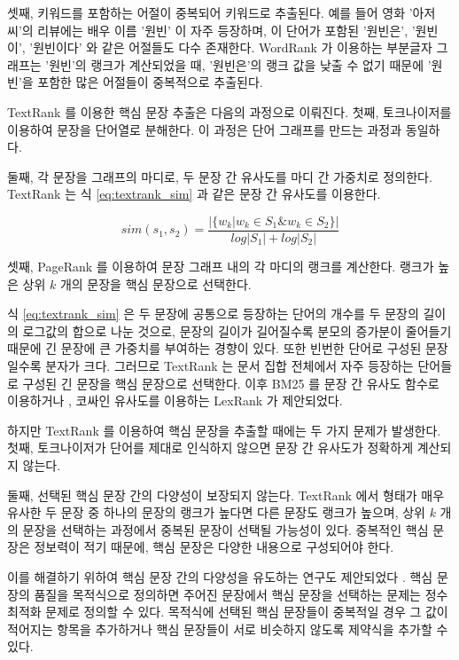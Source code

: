 \documentclass[oneside, ko,phd]{snuthesis_utf8_kor}
\begin{document}
셋째, 키워드를 포함하는 어절이 중복되어 키워드로 추출된다.
예를 들어 영화 '아저씨'의 리뷰에는 배우 이름 '원빈' 이 자주 등장하며, 이 단어가 포함된 '원빈은', '원빈이', '원빈이다' 와 같은 어절들도 다수 존재한다.
WordRank 가 이용하는 부분글자 그래프는 '원빈'의 랭크가 계산되었을 때, '원빈은'의 랭크 값을 낮출 수 없기 때문에 '원빈'을 포함한 많은 어절들이 중복적으로 추출된다.

TextRank 를 이용한 핵심 문장 추출은 다음의 과정으로 이뤄진다.
첫째, 토크나이저를 이용하여 문장을 단어열로 분해한다.
이 과정은 단어 그래프를 만드는 과정과 동일하다.

둘째, 각 문장을 그래프의 마디로, 두 문장 간 유사도를 마디 간 가중치로 정의한다.
TextRank 는 식 \ref{eq:textrank_sim} 과 같은 문장 간 유사도를 이용한다.

\begin{equation}
\label{eq:textrank_sim}
sim(s_1, s_2) = \frac{\vert \{ w_k \vert w_k \in S_1 \& w_k \in S_2 \} \vert}{log \vert S_1 \vert + log \vert S_2 \vert}
\end{equation}

셋째, PageRank \cite{ilprints422} 를 이용하여 문장 그래프 내의 각 마디의 랭크를 계산한다.
랭크가 높은 상위 $k$ 개의 문장을 핵심 문장으로 선택한다.

식 \ref{eq:textrank_sim} 은 두 문장에 공통으로 등장하는 단어의 개수를 두 문장의 길이의 로그값의 합으로 나눈 것으로, 문장의 길이가 길어질수록 분모의 증가분이 줄어들기 때문에 긴 문장에 큰 가중치를 부여하는 경향이 있다.
또한 빈번한 단어로 구성된 문장일수록 분자가 크다.
그러므로 TextRank 는 문서 집합 전체에서 자주 등장하는 단어들로 구성된 긴 문장을 핵심 문장으로 선택한다.
이후 BM25 \cite{robertson2009probabilistic} 를 문장 간 유사도 함수로 이용하거나 \cite{barrios2016variations}, 코싸인 유사도를 이용하는 LexRank \cite{erkan2004lexrank} 가 제안되었다.

하지만 TextRank 를 이용하여 핵심 문장을 추출할 때에는 두 가지 문제가 발생한다.
첫째, 토크나이저가 단어를 제대로 인식하지 않으면 문장 간 유사도가 정확하게 계산되지 않는다.

둘째, 선택된 핵심 문장 간의 다양성이 보장되지 않는다.
TextRank 에서 형태가 매우 유사한 두 문장 중 하나의 문장의 랭크가 높다면 다른 문장도 랭크가 높으며, 상위 $k$ 개의 문장을 선택하는 과정에서 중복된 문장이 선택될 가능성이 있다.
중복적인 핵심 문장은 정보력이 적기 때문에, 핵심 문장은 다양한 내용으로 구성되어야 한다.

이를 해결하기 위하여 핵심 문장 간의 다양성을 유도하는 연구도 제안되었다 \cite{mcdonald2007study, parveen2015topical}.
핵심 문장의 품질을 목적식으로 정의하면 주어진 문장에서 핵심 문장을 선택하는 문제는 정수 최적화 문제로 정의할 수 있다.
목적식에 선택된 핵심 문장들이 중복적일 경우 그 값이 적어지는 항목을 추가하거나 핵심 문장들이 서로 비슷하지 않도록 제약식을 추가할 수 있다.
\end{document}

